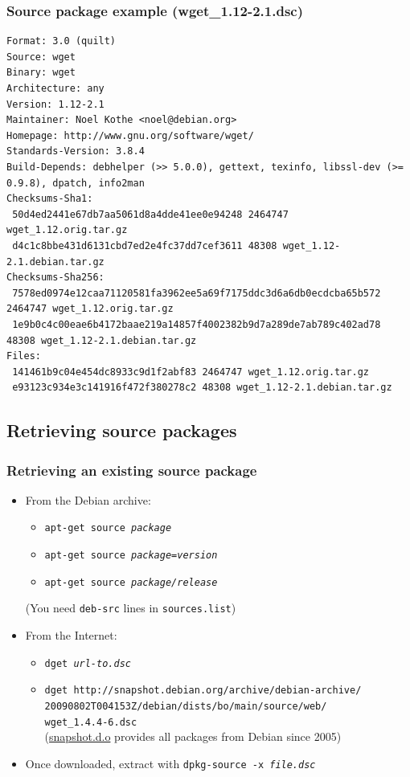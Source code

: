 \documentclass[10pt,final]{beamer}
\begin{document}
\begin{frame}[fragile]
	\frametitle{Source package example (wget\_1.12-2.1.dsc)}
\begin{lstlisting}[basicstyle=\ttfamily\small]
Format: 3.0 (quilt)
Source: wget
Binary: wget
Architecture: any
Version: 1.12-2.1
Maintainer: Noel Kothe <noel@debian.org>
Homepage: http://www.gnu.org/software/wget/
Standards-Version: 3.8.4
Build-Depends: debhelper (>> 5.0.0), gettext, texinfo, libssl-dev (>= 0.9.8), dpatch, info2man
Checksums-Sha1: 
 50d4ed2441e67db7aa5061d8a4dde41ee0e94248 2464747 wget_1.12.orig.tar.gz
 d4c1c8bbe431d6131cbd7ed2e4fc37dd7cef3611 48308 wget_1.12-2.1.debian.tar.gz
Checksums-Sha256: 
 7578ed0974e12caa71120581fa3962ee5a69f7175ddc3d6a6db0ecdcba65b572 2464747 wget_1.12.orig.tar.gz
 1e9b0c4c00eae6b4172baae219a14857f4002382b9d7a289de7ab789c402ad78 48308 wget_1.12-2.1.debian.tar.gz
Files: 
 141461b9c04e454dc8933c9d1f2abf83 2464747 wget_1.12.orig.tar.gz
 e93123c934e3c141916f472f380278c2 48308 wget_1.12-2.1.debian.tar.gz
\end{lstlisting}
\end{frame}

\subsection{Retrieving source packages}
\begin{frame}
\frametitle{Retrieving an existing source package}
\begin{itemize}
\item From the Debian archive:
	\begin{itemize}
		\item \texttt{apt-get source \textsl{package}}
		\item \texttt{apt-get source \textsl{package=version}}
		\item \texttt{apt-get source \textsl{package/release}}
	\end{itemize}
	(You need \texttt{deb-src} lines in \texttt{sources.list})
	\br
\item From the Internet:
	\begin{itemize}
		\item \texttt{dget \textsl{url-to.dsc}}
		\item \texttt{dget http://snapshot.debian.org/archive/debian-archive/\\20090802T004153Z/debian/dists/bo/main/source/web/\\wget\_1.4.4-6.dsc}\\
			(\href{http://snapshot.debian.org/}{\ttfamily snapshot.d.o} provides all packages from Debian since 2005)
	\end{itemize}
\br
\item Once downloaded, extract with \texttt{dpkg-source -x \textsl{file.dsc}}
\end{itemize}
\end{frame}
\end{document}
